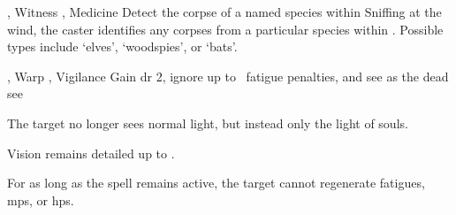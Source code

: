   {\mFate, \mAir}%
  {Witness}%
  {\distant, \detailed}%
  {Medicine}%
  {Detect the corpse of a named species within \spellRange}%
  {
    Sniffing at the wind, the caster identifies any corpses from a particular species within \spellRange.
    Possible types include `elves', `woodspies', or `bats'.
  }

  {\mFate, \mAir}%
  {Warp}%
  {\distant, \detailed}%
  {Vigilance}%
  {Gain \gls{dr} 2, ignore up to ~\gls{fatigue} penalties, and see as the dead see}%
  {
    The target no longer sees normal light, but instead only the light of souls.

    Vision remains detailed up to \spellRange.

    For as long as the spell remains active, the target cannot regenerate \glspl{fatigue}, \glspl{mp}, or \glspl{hp}.
  }

